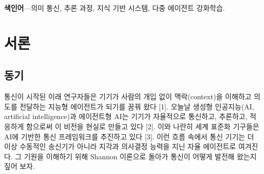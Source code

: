 \begin{abstract}
6세대(6G, sixth-generation) 응용에서는 수신기가 받은 정보를 바탕으로 과업을 수행해야 하는 경우가 늘고 있다. 그러나 기존 방식은 과업과의 관련성과 무관하게 비트 수준의 복원을 최적화한다. 그 결과 부족한 전송 자원이 과업과 무관한 정보에 쓰일 수 있고, 요구되는 데이터 전송률을 맞추기가 점점 어려워진다. 통신의 목적과 최적화 대상 사이의 이러한 불일치는 의미 통신(SC, semantic communication)으로의 패러다임 전환을 이끌었다. 기존 서베이들이 SC를 다루었지만, 적응성과 추론 능력을 갖춘 자율적 SC 시스템은 아직 충분히 탐구되지 않았다. 이 연구 공백을 메우기 위해 우리는 에이전트형 SC(ASC, Agentic SC)라는 개념을 제시한다. ASC는 통신 시스템 안의 에이전트가 과업과 환경 변화에 따라 동적으로 지각하고(perceive), 계획하고(plan), 추론하고(reason), 자기 교정(self-correct)할 수 있게 하여 자율성(autonomy)을 강조한다. 이 서베이에서는 ASC의 개념적 토대를 세우고, 시스템 수준 통합 정도에 따른 새로운 SC 분류 체계(taxonomy)를 제안한다. 이 분류 체계 안에서 기존 연구를 검토하고, 대표적 기법을 짚으며, 여러 연구 흐름에서 얻은 교훈을 정리한다. 구체적으로, 대규모 언어 모델, 세계 모델(world model), 외부 지식, 오케스트레이션(orchestration), 창발적 통신(emergent communication)에 기반한 에이전트가 어떻게 자율성과 적응성을 얻을 수 있는지 살펴본다. 아울러 ASC 시스템이 대규모로 동작할 수 있게 하는 협력 통신과 조정(coordination) 전략, 엣지 배포(edge deployment) 기법을 조사한다. 더 나아가 ASC의 유망한 응용과 활용 사례를 제시하고, 시스템 구현을 위한 미해결 과제를 밝히며, 향후 연구 방향을 제안한다.
\end{abstract}

\noindent\textbf{색인어}---의미 통신, 추론 과정, 지식 기반 시스템, 다중 에이전트 강화학습.

\section{서론}

\subsection{동기}
통신이 시작된 이래 연구자들은 기기가 사람의 개입 없이 맥락(context)을 이해하고 의도를 전달하는 지능형 에이전트가 되기를 꿈꿔 왔다 [1]. 오늘날 생성형 인공지능(AI, artificial intelligence)과 에이전트형 AI는 기기가 자율적으로 통신하고, 추론하고, 적응하게 함으로써 이 비전을 현실로 만들고 있다 [2]. 이와 나란히 세계 표준화 기구들은 AI에 기반한 통신 프레임워크를 추진하고 있다 [3]. 이런 흐름 속에서 통신 기기는 더 이상 수동적인 송신기가 아니라 지각과 의사결정 능력을 지닌 자율 에이전트로 여겨진다. 그 기원을 이해하기 위해 Shannon 이론으로 돌아가 통신이 어떻게 발전해 왔는지 짚어 보자.

